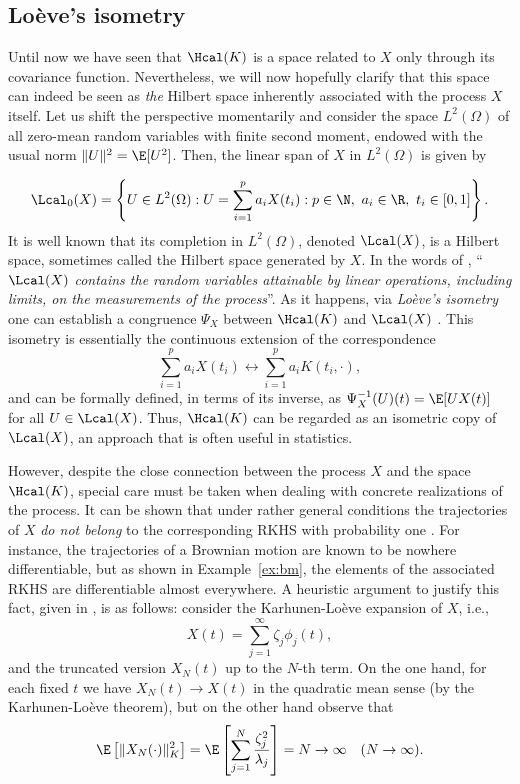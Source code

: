 \subsection*{Loève's isometry}

Until now we have seen that \(\Hcal(K)\) is a space related to \(X\) only through its covariance function. Nevertheless, we will now hopefully clarify that this space can indeed be seen as \textit{the} Hilbert space inherently associated with the process \(X\) itself. Let us shift the perspective momentarily and consider the space \(L^2(\Omega)\) of all zero-mean random variables with finite second moment, endowed with the usual norm \(\|U\|^2=\E[U^2]\). Then, the linear span of \(X\) in \(L^2(\Omega)\) is given by

\setlength{\headsep}{11pt}

\[
\Lcal_0(X) = \left\{U \in L^2(\Omega): U = \sum_{i=1}^p a_i X(t_i): p\in\N, \ a_i \in \R, \ t_i \in [0,1]\right\}.
\]
It is well known that its completion in \(L^2(\Omega)\), denoted \(\Lcal(X)\), is a Hilbert space, sometimes called the Hilbert space generated by \(X\). In the words of \citet{berlinet2004reproducing}, ``\(\Lcal(X)\) \textit{contains the random variables attainable by linear operations, including limits, on the measurements of the process}''. As it happens, via \textit{Loève's isometry} \citep{loeve1948fonctions} one can establish a congruence \(\Psi_X\) between \(\Hcal(K)\) and \(\Lcal(X)\) \citep[see Lemma 1.1 in][]{lukic2001stochastic}. This isometry is essentially the continuous extension of the correspondence
  \begin{equation}\label{eq:loeves-isometry}
  \sum_{i=1}^p a_i X(t_i) \longleftrightarrow \sum_{i=1}^p a_i K(t_i, \cdot),
  \end{equation}
and can be formally defined, in terms of its inverse, as \(\Psi^{-1}_X(U)(t) = \E[U X(t)]\) for all \(U \in \Lcal(X)\). Thus, \(\Hcal(K)\) can be regarded as an isometric copy of \(\Lcal(X)\), an approach that is often useful in statistics.

However, despite the close connection between the process \(X\) and the space \(\Hcal(K)\), special care must be taken when dealing with concrete realizations of the process. It can be shown that under rather general conditions the trajectories of \(X\) \textit{do not belong} to the corresponding RKHS with probability one \parencites[e.g.][Cor.~7.1]{lukic2001stochastic}[][Th.~11]{pillai2007characterizing}. For instance, the trajectories of a Brownian motion are known to be nowhere differentiable, but as shown in Example~\ref{ex:bm}, the elements of the associated RKHS are differentiable almost everywhere. A heuristic argument to justify this fact, given in \citet{wahba1990spline}, is as follows: consider the Karhunen-Loève expansion of \(X\), i.e.,
\[
  X(t) = \sum_{j=1}^\infty \zeta_j \phi_j(t),
\]
and the truncated version \(X_N(t)\) up to the \(N\)-th term. On the one hand, for each fixed \(t\) we have \(X_N(t)\to X(t)\) in the quadratic mean sense (by the Karhunen-Loève theorem), but on the other hand observe that
\[
  \E\left[\|X_N(\cdot)\|^2_K\right] = \E \left[\sum_{j=1}^N \frac{\zeta_j^2}{\lambda_j}\right] = N \to \infty \quad (N\to\infty).
\]

